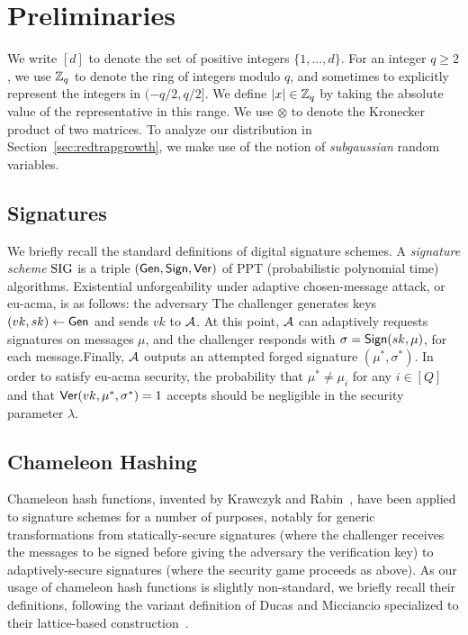 \section{Preliminaries}
We write $[d]$  to denote the set of positive integers $\{1,
\ldots, d\}$. For an integer $q\geq 2$, we use $\mathbb{Z}_q$ to denote the
ring of integers modulo $q$, and sometimes to explicitly represent the
integers in $(-q/2,q/2]$. We define $\lvert x\rvert \in \mathbb{Z}_q$ by taking the
absolute value of the representative in this range. We use $\otimes$ to denote the Kronecker product of two matrices. To analyze our distribution in Section~\ref{sec:redtrapgrowth}, we
make use of the notion of \emph{subgaussian} random variables. 

\subsection{Signatures}
\label{sec:signatures}
We briefly recall the standard definitions of digital signature schemes.
A \emph{signature scheme} $\text{SIG}$ is a triple
$(\mathsf{Gen},\mathsf{Sign},\mathsf{Ver})$ of PPT (probabilistic polynomial time)
algorithms. Existential unforgeability under adaptive chosen-message
attack, or eu-acma, is as follows: the adversary The challenger
generates keys $(vk,sk) \gets \mathsf{Gen}$ and sends $vk$ to $\mathcal{A}$. At
this point, $\mathcal{A}$ can adaptively requests signatures on messages
$\mu$, and the challenger responds with $\sigma=\mathsf{Sign}(sk,\mu)$, for
each message.Finally,
  $\mathcal{A}$ outputs an attempted forged signature $(\mu^*, \sigma^*)$. In
  order to satisfy eu-acma security, the probability that $\mu^* \neq
  \mu_i$ for any $i \in [Q]$ and that
  $\mathsf{Ver}(vk,\mu^*,\sigma^*)=1$ accepts should be negligible in the
  security parameter $\lambda$. 

\subsection{Chameleon Hashing}
\label{sec:chameleon-hashing}


Chameleon hash functions, invented by Krawczyk and Rabin~\cite{DBLP:conf/ndss/KrawczykR00}, have been applied to signature
schemes for a number of purposes, notably for generic transformations
from statically-secure signatures (where the challenger receives the
messages to be signed before giving the adversary the verification
key) to adaptively-secure signatures (where the security game proceeds
as above). As our usage of chameleon hash functions is slightly
non-standard, we briefly recall their definitions, following the
variant definition of Ducas
and Micciancio specialized to their lattice-based
construction~\cite{DBLP:conf/crypto/DucasM14}. 

